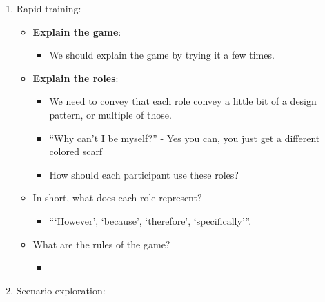 \documentclass[11pt]{article}
\begin{document}
\begin{enumerate}
\item Rapid training:
\label{sec:orgabef6a4}

\begin{itemize}
\item \textbf{Explain the game}:
\begin{itemize}
\item We should explain the game by trying it a few times.
\end{itemize}
\item \textbf{Explain the roles}:
\begin{itemize}
\item We need to convey that each role convey a little bit of a design pattern, or multiple of those.
\item “Why can’t I be myself?” - Yes you can, you just get a different colored scarf
\item How should each participant use these roles?
\end{itemize}
\item In short, what does each role represent?
\begin{itemize}
\item ``‘However’, ‘because’, ‘therefore’, ‘specifically’''.
\end{itemize}
\item What are the rules of the game?
\begin{itemize}
\item{}
\end{itemize}
\end{itemize}

\item Scenario exploration:
\label{sec:orga2c0f30}


\end{enumerate}
\end{document}
